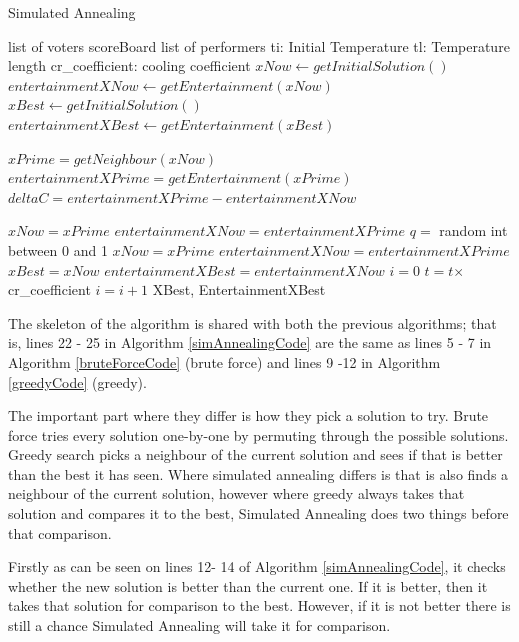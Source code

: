 \documentclass[12pt]{report}
\begin{document}
\begin{algorithm}
\caption{Simulated Annealing}
\label{simAnnealingCode}
\begin{algorithmic}[1]
\REQUIRE list of voters
\REQUIRE scoreBoard
\REQUIRE list of performers
\REQUIRE ti: Initial Temperature
\REQUIRE tl: Temperature length
\REQUIRE cr\_coefficient: cooling coefficient
\STATE $xNow \leftarrow getInitialSolution()$
\STATE $entertainmentXNow \leftarrow getEntertainment(xNow)$
\STATE $xBest \leftarrow getInitialSolution()$
\STATE $entertainmentXBest \leftarrow getEntertainment(xBest)$

\STATE $xPrime = getNeighbour(xNow)$
\STATE $entertainmentXPrime = getEntertainment(xPrime)$
\STATE $deltaC = entertainmentXPrime - entertainmentXNow$

\STATE $xNow = xPrime$
\STATE $entertainmentXNow = entertainmentXPrime$
\ELSE
\STATE$q = $ random int between 0 and 1
\STATE $xNow = xPrime$
\STATE $entertainmentXNow = entertainmentXPrime$
\ENDIF
\ENDIF
{}
\STATE $xBest = xNow$
\STATE $entertainmentXBest = entertainmentXNow$
\STATE $i = 0$
\ENDIF
\ENDFOR
\STATE $t = t $$\times$cr\_coefficient
\STATE $i = i + 1$
\ENDWHILE
\RETURN XBest, EntertainmentXBest
\end{algorithmic}
\end{algorithm}

The skeleton of the algorithm is shared with both the previous algorithms; that is, lines 22 - 25 in Algorithm \ref{simAnnealingCode} are the same as lines 5 - 7 in Algorithm \ref{bruteForceCode} (brute force) and lines 
9 -12 in Algorithm \ref{greedyCode} (greedy).

The important part where they differ is how they pick a solution to try. Brute force tries every solution one-by-one by permuting through the possible solutions. Greedy search picks a neighbour of the current solution and sees if that is better than the best it has seen. Where simulated annealing differs is that is also finds a neighbour of the current solution, however where greedy always takes that solution and compares it to the best, Simulated Annealing does two things before that comparison.

Firstly as can be seen on lines 12- 14 of Algorithm \ref{simAnnealingCode}, it checks whether the new solution is better than the current one. If it is better, then it takes that solution for comparison to the best. However, if it is not better there is still a chance Simulated Annealing will take it for comparison. 
\end{document}
